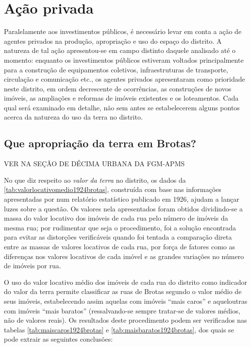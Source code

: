 \section{Ação privada}\label{sec:acaoprivada}

Paralelamente aos investimentos públicos, é necessário levar em conta a ação de agentes privados na produção, apropriação e uso do espaço do distrito. A natureza de tal ação apresentou-se em campo distinto daquele analisado até o momento: enquanto os investimentos públicos estiveram voltados principalmente para a construção de equipamentos coletivos, infraestruturas de transporte, circulação e comunicação etc., os agentes privados apresentaram como prioridade neste distrito, em ordem decrescente de ocorrências, as construções de novos imóveis, as ampliações e reformas de imóveis existentes e os loteamentos. Cada qual será examinado em detalhe, não sem antes se estabelecerem alguns pontos acerca da natureza do uso da terra no distrito.

\subsection{Que apropriação da terra em Brotas?}\label{subsec:apropribrotas}

VER NA SEÇÃO DE DÉCIMA URBANA DA FGM-APMS




No que diz respeito ao \textit{valor da terra} no distrito, os dados da \autoref{tab:valorlocativomedio1924brotas}, construída com base nas informações apresentadas por  num relatório estatístico publicado em 1926, ajudam a lançar luzes sobre a questão. Os valores nela apresentados foram obtidos dividindo-se a massa do valor locativo dos imóveis de cada rua pelo número de imóveis da mesma rua; por rudimentar que seja o procedimento, foi a solução encontrada para evitar as distorções verificáveis quando foi tentada a comparação direta entre as massas de valores locativos de cada rua, por força de fatores como as diferenças nos valores locativos de cada imóvel e as grandes variações no número de imóveis por rua.



O uso do valor locativo médio dos imóveis de cada rua do distrito como indicador do valor da terra permite classificar as ruas de Brotas segundo o valor médio de seus imóveis, estabelecendo assim aquelas com imóveis ``mais caros'' e aqueloutras com imóveis ``mais baratos'' (ressalvando-se sempre tratar-se de valores médios, não de valores reais). Os resultados deste procedimento podem ser verificados nas tabelas \autoref{tab:maiscaros1924brotas} e \autoref{tab:maisbaratos1924brotas}, dos quais se pode extrair as seguintes conclusões:

